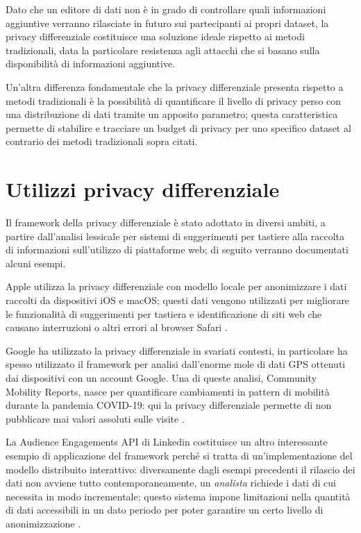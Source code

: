 Dato che un editore di dati non è in grado di controllare quali informazioni aggiuntive verranno rilasciate in futuro sui partecipanti ai propri dataset, la privacy differenziale costituisce una soluzione ideale rispetto ai metodi tradizionali, data la particolare resistenza agli attacchi che si basano sulla disponibilità di informazioni aggiuntive.

Un'altra differenza fondamentale che la privacy differenziale presenta rispetto a metodi tradizionali è la possibilità di quantificare il livello di privacy perso con una distribuzione di dati tramite un apposito parametro; questa caratteristica permette di stabilire e tracciare un budget di privacy per uno specifico dataset al contrario dei metodi tradizionali sopra citati.

\section{Utilizzi privacy differenziale}
Il framework della privacy differenziale è stato adottato in diversi ambiti, a partire dall'analisi lessicale per sistemi di suggerimenti per tastiere alla raccolta di informazioni sull'utilizzo di piattaforme web; di seguito verranno documentati alcuni esempi.

Apple utilizza la privacy differenziale con modello locale per anonimizzare i dati raccolti da dispositivi iOS e macOS; questi dati vengono utilizzati per migliorare le funzionalità di suggerimenti per tastiera e identificazione di siti web che causano interruzioni o altri errori al browser Safari \cite{appledpatscale}.

Google ha utilizzato la privacy differenziale in svariati contesti, in particolare ha spesso utilizzato il framework per analisi dall'enorme mole di dati GPS ottenuti dai dispositivi con un account Google. Una di queste analisi, Community Mobility Reports, nasce per quantificare cambiamenti in pattern di mobilità durante la pandemia COVID-19: qui la privacy differenziale permette di non pubblicare mai valori assoluti sulle visite \cite{googlecovid19communitymobility}.

La Audience Engagements API di Linkedin costituisce un altro interessante esempio di applicazione del framework perché si tratta di un'implementazione del modello distribuito interattivo: diversamente dagli esempi precedenti il rilascio dei dati non avviene tutto contemporaneamente, un \textit{analista} richiede i dati di cui necessita in modo incrementale; questo sistema impone limitazioni nella quantità di dati accessibili in un dato periodo per poter garantire un certo livello di anonimizzazione \cite{rogers2020linkedinsaudienceengagementsapi}.

